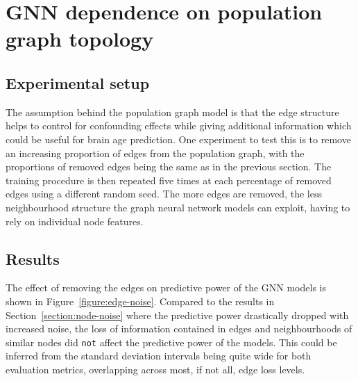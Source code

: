\section{GNN dependence on population graph topology}
\subsection{Experimental setup}
The assumption behind the population graph model is that the edge structure helps to control for confounding effects while giving additional information which could be useful for brain age prediction. One experiment to test this is to remove an increasing proportion of edges from the population graph, with the proportions of removed edges being the same as in the previous section. The training procedure is then repeated five times at each percentage of removed edges using a different random seed. The more edges are removed, the less neighbourhood structure the graph neural network models can exploit, having to rely on individual node features. 

\subsection{Results}
The effect of removing the edges on predictive power of the GNN models is shown in Figure~\ref{figure:edge-noise}. Compared to the results in Section~\ref{section:node-noise} where the predictive power drastically dropped with increased noise, the loss of information contained in edges and neighbourhoods of similar nodes did \texttt{not} affect the predictive power of the models. This could be inferred from the standard deviation intervals being quite wide for both evaluation metrics, overlapping across most, if not all, edge loss levels.




